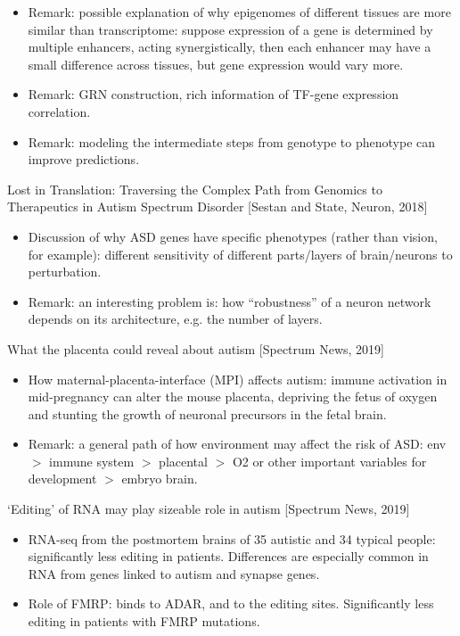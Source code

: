 \documentclass{report}
\begin{document}
\begin{itemize}
	\item Remark: possible explanation of why epigenomes of different tissues are more similar than transcriptome: suppose expression of a gene is determined by multiple enhancers, acting synergistically, then each enhancer may have a small difference across tissues, but gene expression would vary more.   
	
	\item Remark: GRN construction, rich information of TF-gene expression correlation. 
	
	\item Remark: modeling the intermediate steps from genotype to phenotype can improve predictions. 
\end{itemize}

Lost in Translation: Traversing the Complex Path from Genomics to Therapeutics in Autism Spectrum Disorder [Sestan and State, Neuron, 2018]
\begin{itemize}
	\item Discussion of why ASD genes have specific phenotypes (rather than vision, for example): different sensitivity of different parts/layers of brain/neurons to perturbation.
	
	\item Remark: an interesting problem is: how ``robustness'' of a neuron network depends on its architecture, e.g. the number of layers. 
\end{itemize}

What the placenta could reveal about autism [Spectrum News, 2019]
\begin{itemize}
	\item How maternal-placenta-interface (MPI) affects autism: immune activation in mid-pregnancy can alter the mouse placenta, depriving the fetus of oxygen and stunting the growth of neuronal precursors in the fetal brain.
	
	\item Remark: a general path of how environment may affect the risk of ASD: env $>$ immune system $>$ placental $>$ O2 or other important variables for development $>$ embryo brain.
\end{itemize}

‘Editing’ of RNA may play sizeable role in autism [Spectrum News, 2019]
\begin{itemize}
	\item RNA-seq from the postmortem brains of 35 autistic and 34 typical people: significantly less editing in patients. Differences are especially common in RNA from genes linked to autism and synapse genes.
	
	\item Role of FMRP: binds to ADAR, and to the editing sites. Significantly less editing in patients with FMRP mutations.
\end{itemize}
\end{document}
